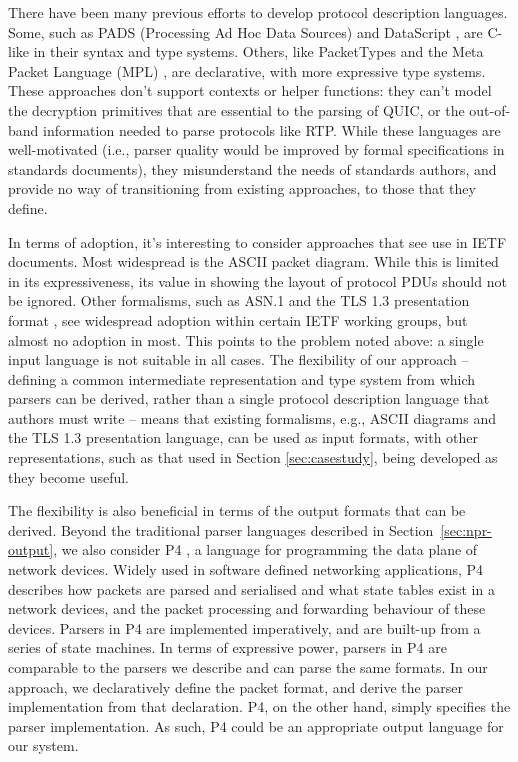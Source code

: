 \documentclass[10pt,sigconf]{acmart}
\begin{document}
There have been many previous efforts to develop protocol description languages.
Some, such as PADS (Processing Ad Hoc Data Sources)
\cite{fisher2005pads} and DataScript \cite{back2002datascript}, are C-like in their syntax
and type systems. Others, like PacketTypes \cite{mccann2000packet} and the Meta Packet
Language (MPL) \cite{madhavapeddy2007melange}, are declarative, with more expressive type
systems. These approaches don't support contexts or helper functions: they can't
model the decryption primitives that are essential to the parsing of
QUIC, or the out-of-band information needed to parse protocols like RTP.
While these languages are well-motivated (i.e., parser quality
would be improved by formal specifications in standards documents), they
misunderstand the needs of standards authors, and provide no way of
transitioning from existing approaches, to those that they define.

In terms of adoption, it's interesting to consider approaches that see use in IETF
documents. Most widespread is the ASCII packet diagram. While this is
limited in its expressiveness, its value in showing the layout of protocol PDUs should not
be ignored. Other formalisms, such as ASN.1 \cite{x680} and the TLS 1.3 presentation
format \cite{draft-ietf-tls-tls13-28}, see widespread adoption within certain IETF
working groups, but almost no adoption in most. This points to the problem noted above: a
single input language is not suitable in all cases. The flexibility of our approach --
defining a common intermediate representation and type system from which
parsers can be derived, rather than a single protocol description language
that authors must write -- means that existing formalisms, e.g., ASCII
diagrams and the TLS 1.3 presentation language, can be used as input
formats, with other representations, such as that used in Section
\ref{sec:casestudy}, being developed as they become useful. 

The flexibility is also beneficial in terms of the output formats that can be derived.
Beyond the traditional parser languages described in
Section~\ref{sec:npr-output}, we also consider P4
\cite{bosshart:2014:p4,p4consortium:2018:v16spec-20180531}, a language for
programming the data plane of network devices. Widely used in software defined
networking applications, P4 describes how packets are parsed and serialised and what state
tables exist in a network devices, and the packet processing and forwarding behaviour of
these devices. Parsers in P4 are
implemented imperatively, and are built-up from a series of state machines. In terms of
expressive power, parsers in P4 are comparable to the parsers we describe and can parse
the same formats. In our approach, we declaratively define the packet
format, and derive the parser implementation from that declaration. P4, on the other hand,
simply specifies the parser implementation. As such, P4 could be an appropriate output
language for our system.
\end{document}
